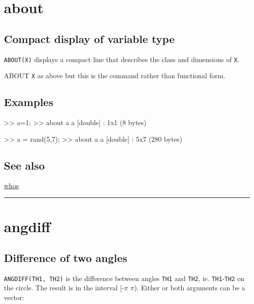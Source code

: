
\hypertarget{about}{\section*{about}}
\subsection*{Compact display of variable type}


\texttt{ABOUT(X)} displays a compact line that describes the class and dimensions of
\texttt{X}.



ABOUT \texttt{X}  as above but this is the command rather than functional form.


\subsection*{Examples}
\begin{Code}
   >> a=1;
   >> about a
   a [double] : 1x1 (8 bytes)

   >> a = rand(5,7);
   >> about a
   a [double] : 5x7 (280 bytes)

\end{Code}

\subsection*{See also}


\hyperlink{whos}{\color{blue} whos}

\vspace{1.5ex}\rule{\textwidth}{1mm}

\hypertarget{angdiff}{\section*{angdiff}}
\subsection*{Difference of two angles}


\texttt{ANGDIFF(TH1, TH2)} is the difference between angles \texttt{TH1} and \texttt{TH2}, ie. \texttt{TH1}-\texttt{TH2}
on the circle.  The result is in the interval [-$\pi$ $\pi$).  Either or both
arguments can be a vector:

